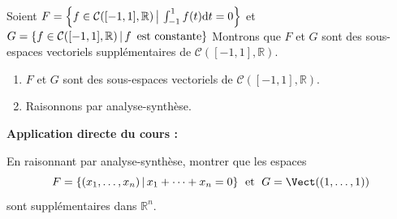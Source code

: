 \documentclass[french,11pt,twoside]{VcCours}
\newenvironment{ApplicationDirecte}{\textbf{Application directe du cours :}

}{}
\newcommand{\dx}{\text{d}x}
\newcommand{\dt}{\text{d}t}
\newcommand{\Int}[2]{\int_{#1}^{#2}}
\begin{document}
\begin{Exemple} Soient $F = \left\lbrace f \in \mathcal{C}([-1,1], \mathbb{R}) \, \big{\vert} \, \int_{ - 1}^{1} f(t) \dt = 0\right\rbrace$ et $G = \left\lbrace  f \in \mathcal{C}([-1,1], \mathbb{R})\, \vert \, f \, \hbox{ est constante} \right\rbrace$
Montrons que $F$ et $G$ sont des sous-espaces vectoriels supplémentaires de $\mathcal{C}([-1,1], \mathbb{R})$.
\begin{enumerate}
\item $F$ et $G$ sont des sous-espaces vectoriels de $\mathcal{C}([-1,1], \mathbb{R})$.
\item Raisonnons par analyse-synthèse.
%
%
%
%
%
\end{enumerate}

\newpage

\vspace*{7cm}

\end{Exemple}
%

\begin{ApplicationDirecte}\label{Exo}  En raisonnant par analyse-synthèse, montrer que les espaces 
$$ F = \lbrace (x_1, \ldots, x_n) \, \vert \, x_1 + \cdots + x_n = 0 \rbrace \; \hbox{ et } \; G= \Vect((1, \ldots, 1)) $$
sont supplémentaires dans $\mathbb{R}^n$.
\end{ApplicationDirecte}
\end{document}
